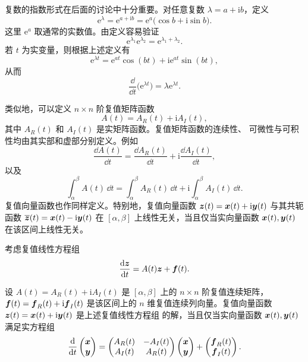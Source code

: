 复数的指数形式在后面的讨论中十分重要。对任意复数
$\lambda=a+\mathrm{i}b$，定义
\[
	\mathrm{e}^{\lambda}
	=\mathrm{e}^{a+\mathrm{i}b}
	=\mathrm{e}^{a}\bigl(\cos b+\mathrm{i}\sin b\bigr).
\]
这里 $\mathrm{e}^{a}$ 取通常的实数值。由定义容易验证
\[
	\mathrm{e}^{\lambda_1}\mathrm{e}^{\lambda_2}
	=\mathrm{e}^{\lambda_1+\lambda_2}.
\]
若 $t$ 为实变量，则根据上述定义有
\[
	\mathrm{e}^{\lambda t}
	=\mathrm{e}^{at}\cos(bt)
	+\mathrm{i}\mathrm{e}^{at}\sin(bt),
\]
从而
\[
	\dfrac{\dd}{\dd t}\bigl(\mathrm{e}^{\lambda t}\bigr)
	=\lambda\mathrm{e}^{\lambda t}.
\]

类似地，可以定义 $n\times n$ 阶复值矩阵函数
\[
	A(t)=A_R(t)+\mathrm{i}A_I(t),
\]
其中 $A_R(t)$ 和 $A_I(t)$ 是实矩阵函数。复值矩阵函数的连续性、
可微性与可积性均由其实部和虚部分别定义。例如
\[
	\dfrac{\dd A(t)}{\dd t}
	=\dfrac{\dd A_R(t)}{\dd t}
	+\mathrm{i}\dfrac{\dd A_I(t)}{\dd t},
\]
以及
\[
	\int_{\alpha}^{\beta}A(t)\,\dd t
	=\int_{\alpha}^{\beta}A_R(t)\,\dd t
	+\mathrm{i}\int_{\alpha}^{\beta}A_I(t)\,\dd t.
\]
复值向量函数也作同样定义。特别地，复值向量函数
$\boldsymbol{z}(t)=\boldsymbol{x}(t)+\mathrm{i}\boldsymbol{y}(t)$ 与其共轭函数
$\overline{\boldsymbol{z}}(t)=\boldsymbol{x}(t)-\mathrm{i}\boldsymbol{y}(t)$ 在
$[\alpha,\beta]$ 上线性无关，当且仅当实向量函数
$\boldsymbol{x}(t),\boldsymbol{y}(t)$ 在该区间上线性无关。

考虑复值线性方程组
\[
	\dfrac{\mathrm{d}\boldsymbol{z}}{\mathrm{d} t}
	=A(t)\boldsymbol{z}+\boldsymbol{f}(t).
\]

\begin{proposition}\label{thm:复值线性方程组的实化}
	设 $A(t)=A_R(t)+\mathrm{i}A_I(t)$ 是 $[\alpha,\beta]$ 上的
	$n\times n$ 阶复值连续矩阵，
	$\boldsymbol{f}(t)=\boldsymbol{f}_R(t)+\mathrm{i}\boldsymbol{f}_I(t)$ 是该区间上的
	$n$ 维复值连续列向量。复值向量函数
	$\boldsymbol{z}(t)=\boldsymbol{x}(t)+\mathrm{i}\boldsymbol{y}(t)$ 是上述复值线性方程组
	的解，当且仅当实向量函数
	$\boldsymbol{x}(t),\boldsymbol{y}(t)$ 满足实方程组
	\[
		\dfrac{\mathrm{d}}{\mathrm{d} t}
		\begin{pmatrix}
			\boldsymbol{x}\\
			\boldsymbol{y}
		\end{pmatrix}
		=
		\begin{pmatrix}
			A_R(t) & -A_I(t)\\
			A_I(t) & A_R(t)
		\end{pmatrix}
		\begin{pmatrix}
			\boldsymbol{x}\\
			\boldsymbol{y}
		\end{pmatrix}
		+
		\begin{pmatrix}
			\boldsymbol{f}_R(t)\\
			\boldsymbol{f}_I(t)
		\end{pmatrix}.
	\]
\end{proposition}

